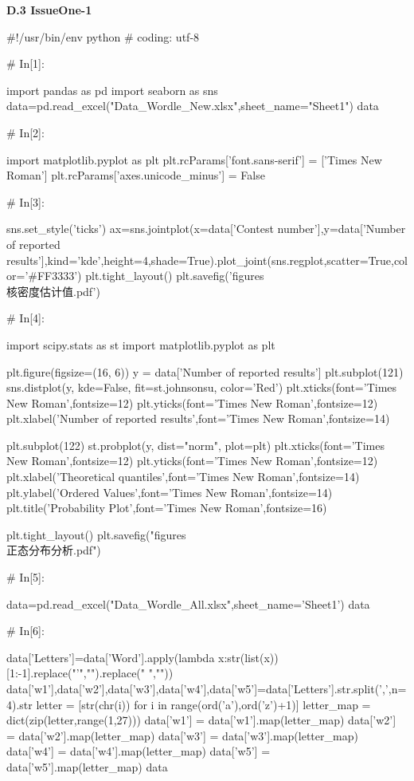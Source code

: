 \documentclass{MathModeling}
\begin{document}
\newpage
\textbf{D.3 IssueOne-1}
\begin{python}
#!/usr/bin/env python
# coding: utf-8

# In[1]:


import pandas as pd
import seaborn as sns
data=pd.read_excel("Data_Wordle_New.xlsx",sheet_name="Sheet1")
data


# In[2]:


import matplotlib.pyplot as plt
plt.rcParams['font.sans-serif'] = ['Times New Roman']
plt.rcParams['axes.unicode_minus'] = False


# In[3]:


sns.set_style('ticks')
ax=sns.jointplot(x=data['Contest number'],y=data['Number of reported results'],kind='kde',height=4,shade=True).plot_joint(sns.regplot,scatter=True,color='#FF3333')
plt.tight_layout()
plt.savefig('figures\\核密度估计值.pdf')


# In[4]:


import scipy.stats as st
import matplotlib.pyplot as plt

plt.figure(figsize=(16, 6))
y = data['Number of reported results']
plt.subplot(121)
sns.distplot(y, kde=False, fit=st.johnsonsu, color='Red')
plt.xticks(font='Times New Roman',fontsize=12)
plt.yticks(font='Times New Roman',fontsize=12)
plt.xlabel('Number of reported results',font='Times New Roman',fontsize=14)

plt.subplot(122)
st.probplot(y, dist="norm", plot=plt)
plt.xticks(font='Times New Roman',fontsize=12)
plt.yticks(font='Times New Roman',fontsize=12)
plt.xlabel('Theoretical quantiles',font='Times New Roman',fontsize=14)
plt.ylabel('Ordered Values',font='Times New Roman',fontsize=14)
plt.title('Probability Plot',font='Times New Roman',fontsize=16)

plt.tight_layout()
plt.savefig("figures\\正态分布分析.pdf")


# In[5]:


data=pd.read_excel("Data_Wordle_All.xlsx",sheet_name='Sheet1')
data


# In[6]:


data['Letters']=data['Word'].apply(lambda x:str(list(x))[1:-1].replace("'","").replace(" ",""))
data['w1'],data['w2'],data['w3'],data['w4'],data['w5']=data['Letters'].str.split(',',n=4).str
letter = [str(chr(i)) for i in range(ord('a'),ord('z')+1)]
letter_map = dict(zip(letter,range(1,27)))
data['w1'] = data['w1'].map(letter_map)
data['w2'] = data['w2'].map(letter_map)
data['w3'] = data['w3'].map(letter_map)
data['w4'] = data['w4'].map(letter_map)
data['w5'] = data['w5'].map(letter_map)
data



\end{python}
\end{document}
